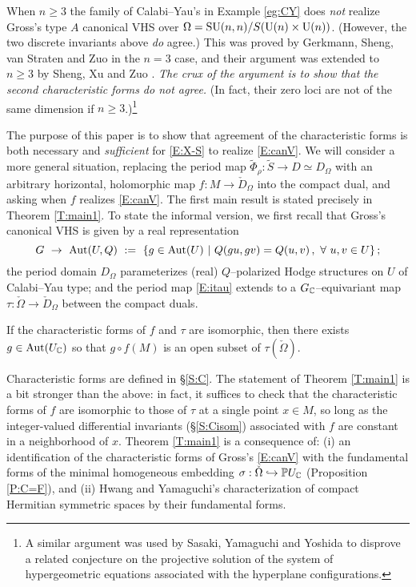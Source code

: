 \documentclass[12pt]{amsart}
\numberwithin{equation}{section}
\numberwithin{table}{section}
\numberwithin{figure}{section}
\begin{document}
\begin{example} \label{eg:SZ}
When $n\ge 3$ the family of Calabi--Yau's in Example \ref{eg:CY} does \emph{not} realize Gross's type $A$ canonical VHS over $\Omega = \mathrm{SU}(n,n)/S(\mathrm{U}(n) \times \mathrm{U}(n))$.  (However, the two discrete invariants above \emph{do} agree.)  This was proved by Gerkmann, Sheng, van Straten and Zuo \cite{MR3004580} in the $n=3$ case, and their argument was extended to $n\ge 3$ by Sheng, Xu and Zuo \cite{MR3303246}.  \emph{The crux of the argument is to show that the second characteristic forms do not agree.}  (In fact, their zero loci are not of the same dimension if $n\ge3$.)\footnote{A similar argument was used by Sasaki, Yamaguchi and Yoshida \cite{MR1476250} to disprove a related conjecture on the projective solution of the system of hypergeometric equations associated with the hyperplane configurations.}
\end{example}

The purpose of this paper is to show that agreement of the characteristic forms is both necessary and \emph{sufficient} for \eqref{E:X-S} to realize \eqref{E:canV}.  We will consider a more general situation, replacing the period map $\tilde\Phi_\rho : \tilde S \to D\simeq D_\Omega$ with an arbitrary horizontal, holomorphic map $f : M \to \check D_\Omega$ into the compact dual, and asking when $f$ realizes \eqref{E:canV}.  The first main result is stated precisely in Theorem \ref{T:main1}.  To state the informal version, we first recall that Gross's canonical VHS is given by a real representation 
\begin{equation} \label{E:iG}
  G \ \to \ \tAut(U,Q) \ 
  := \ \{ g \in \tAut(U) \ | \ Q(gu,gv) = Q(u,v) \,,\ \forall \ u,v \in U \}\,;
\end{equation}
the period domain $D_\Omega$ parameterizes (real) $Q$--polarized Hodge structures on $U$ of Calabi--Yau type; and the period map \eqref{E:itau} extends to a $G_\mathbb C$--equivariant map $\tau : \check \Omega \to \check D_\Omega$ between the compact duals.

\begin{mainthm} \label{T:mt1}
If the characteristic forms of $f$ and $\tau$ are isomorphic, then there exists $g \in \mathrm{Aut}(U_\mathbb C)$ so that $g\circ f(M)$ is an open subset of $\tau(\check\Omega)$.
\end{mainthm}

\noindent Characteristic forms are defined in \S\ref{S:C}. The statement of Theorem \ref{T:main1} is a bit stronger than the above: in fact, it suffices to check that the characteristic forms of $f$ are isomorphic to those of $\tau$ at a single point $x \in M$, so long as the integer-valued differential invariants (\S\ref{S:Cisom}) associated with $f$ are constant in a neighborhood of $x$.  Theorem \ref{T:main1} is a consequence of: (i) an identification of the characteristic forms of Gross's \eqref{E:canV} with the fundamental forms of the minimal homogeneous embedding $\sigma: \check\Omega \hookrightarrow \mathbb P U_\mathbb C$ (Proposition \ref{P:C=F}), and (ii) Hwang and Yamaguchi's characterization \cite{MR2030098} of compact Hermitian symmetric spaces by their fundamental forms.
\end{document}

